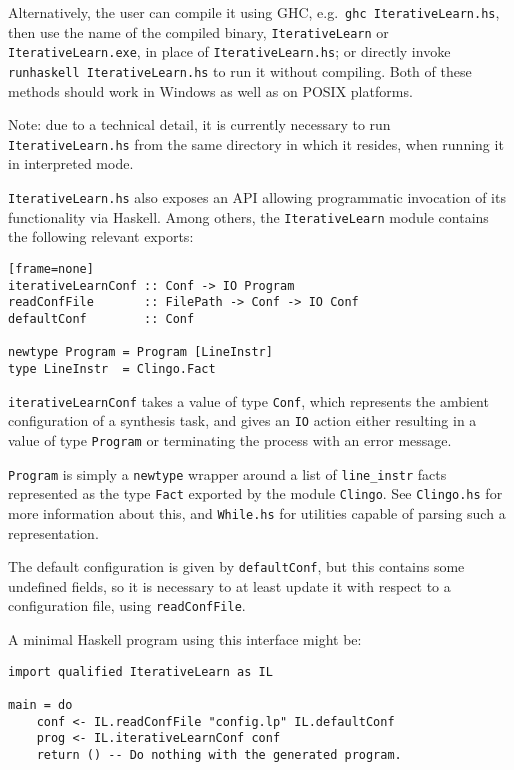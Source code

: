 \documentclass[a4paper,twoside,notitlepage,12pt]{article}
\begin{document}
\sloppy Alternatively, the user can compile it using GHC, e.g.\ 
\verb|ghc IterativeLearn.hs|, then use the name of the compiled binary,
\verb|IterativeLearn| or \verb|IterativeLearn.exe|, in place of
\verb|IterativeLearn.hs|; or directly invoke \verb|runhaskell IterativeLearn.hs|
to run it without compiling. Both of these methods should work in Windows as well
as on POSIX platforms.

Note: due to a technical detail, it is currently necessary to run 
\verb|IterativeLearn.hs| from the same directory in which it resides, when 
running it in interpreted mode.

\verb|IterativeLearn.hs| also exposes an API allowing programmatic invocation of its 
functionality via Haskell. Among others, the \verb|IterativeLearn| module contains the 
following relevant exports:

\begin{verbatim}[frame=none]
iterativeLearnConf :: Conf -> IO Program
readConfFile       :: FilePath -> Conf -> IO Conf
defaultConf        :: Conf

newtype Program = Program [LineInstr]
type LineInstr  = Clingo.Fact
\end{verbatim}

\verb|iterativeLearnConf| takes a value of type \verb|Conf|, which represents the 
ambient configuration of a synthesis task, and gives an \verb|IO| action 
either resulting in a value of type \verb|Program| or terminating the process with an 
error message.

\verb|Program| is simply a \verb|newtype| wrapper around a list of \verb|line_instr| 
facts represented as the type \verb|Fact| exported by the module \verb|Clingo|. See 
\verb|Clingo.hs| for more information about this, and \verb|While.hs| for utilities
capable of parsing such a representation.

The default configuration is given by \verb|defaultConf|, but this contains some 
undefined fields, so it is necessary to at least update it with respect to a 
configuration file, using \verb|readConfFile|.

A minimal Haskell program using this interface might be:

\begin{verbatim}
import qualified IterativeLearn as IL

main = do
    conf <- IL.readConfFile "config.lp" IL.defaultConf
    prog <- IL.iterativeLearnConf conf
    return () -- Do nothing with the generated program.
\end{verbatim}
\end{document}
